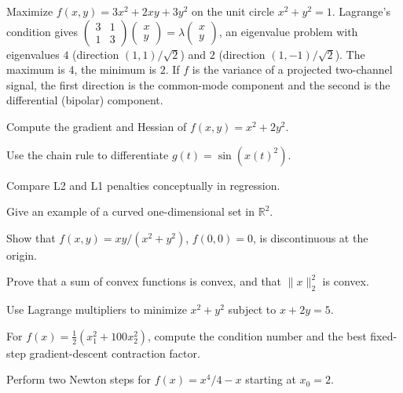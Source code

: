 \begin{workedexample}
Maximize $f(x,y)=3x^2+2xy+3y^2$ on the unit circle $x^2+y^2=1$. Lagrange's condition gives $\begin{pmatrix}3&1\\1&3\end{pmatrix}\begin{pmatrix}x\\y\end{pmatrix}=\lambda\begin{pmatrix}x\\y\end{pmatrix}$, an eigenvalue problem with eigenvalues $4$ (direction $(1,1)/\sqrt2$) and $2$ (direction $(1,-1)/\sqrt2$). The maximum is $4$, the minimum is $2$. If $f$ is the variance of a projected two-channel signal, the first direction is the common-mode component and the second is the differential (bipolar) component.
\end{workedexample}
\begin{exercises}
\item Compute the gradient and Hessian of $f(x,y)=x^2+2y^2$.
\item Use the chain rule to differentiate $g(t)=\sin(x(t)^2)$.
\item Compare L2 and L1 penalties conceptually in regression.
\item Give an example of a curved one-dimensional set in $\mathbb R^2$.
\item Show that $f(x,y)=xy/(x^2+y^2)$, $f(0,0)=0$, is discontinuous at the origin.
\item Prove that a sum of convex functions is convex, and that $\|x\|_2^2$ is convex.
\item Use Lagrange multipliers to minimize $x^2+y^2$ subject to $x+2y=5$.
\item For $f(x)=\tfrac12(x_1^2+100x_2^2)$, compute the condition number and the best fixed-step gradient-descent contraction factor.
\item Perform two Newton steps for $f(x)=x^4/4-x$ starting at $x_0=2$.
\end{exercises}
